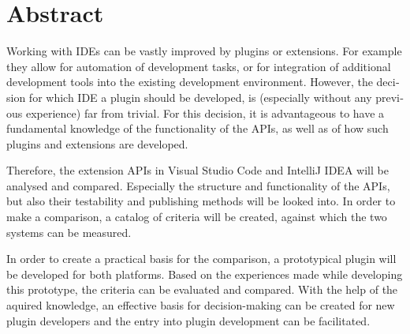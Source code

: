 \chapter{Abstract}


\begin{english} %

Working with IDEs can be vastly improved by plugins
or extensions. For example they allow for automation 
of development tasks, or for integration of additional development
tools into the existing development environment.
However, the decision for which IDE
a plugin should be developed, is (especially without any
previous experience) far from trivial. For this decision,
it is advantageous to have a fundamental knowledge of
the functionality of the APIs, as well as of how such
plugins and extensions are developed.

Therefore, the extension APIs in Visual Studio Code and 
IntelliJ IDEA will be analysed and compared. Especially
the structure and functionality of the APIs, but also
their testability and publishing methods will be looked into.
In order to make a comparison, a catalog of criteria will be created,
against which the two systems can be measured.

In order to create a practical basis for the comparison,
a prototypical plugin will be developed for both platforms.
Based on the experiences made while developing this 
prototype, the criteria can be evaluated and compared.
With the help of the aquired knowledge, an effective
basis for decision-making can be created for
new plugin developers and the entry into plugin development
can be facilitated.

\end{english}
